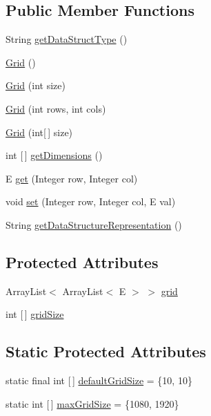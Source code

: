 \subsection*{Public Member Functions}
\begin{DoxyCompactItemize}
\item 
String \mbox{\hyperlink{classbridges_1_1base_1_1_grid_a81f268dd27c292ff2af9358039d4ebe6}{get\+Data\+Struct\+Type}} ()
\item 
\mbox{\hyperlink{classbridges_1_1base_1_1_grid_aa621ffc958db8341f7ce37ed78944d51}{Grid}} ()
\item 
\mbox{\hyperlink{classbridges_1_1base_1_1_grid_a9818d4959813f1292c6a234bc6f6aa9e}{Grid}} (int size)
\item 
\mbox{\hyperlink{classbridges_1_1base_1_1_grid_a43a699bd7ae2c6c986f978c515ff97d8}{Grid}} (int rows, int cols)
\item 
\mbox{\hyperlink{classbridges_1_1base_1_1_grid_ab9975b28d8dda7f3fbe0e35a7a026772}{Grid}} (int\mbox{[}$\,$\mbox{]} size)
\item 
int \mbox{[}$\,$\mbox{]} \mbox{\hyperlink{classbridges_1_1base_1_1_grid_aee8a5b66095d65ff067a4e76f2611b0e}{get\+Dimensions}} ()
\item 
E \mbox{\hyperlink{classbridges_1_1base_1_1_grid_a698579bb5b7166f76a18a1b04916e090}{get}} (Integer row, Integer col)
\item 
void \mbox{\hyperlink{classbridges_1_1base_1_1_grid_ab79ceb737423bb28ea2348e61a625a17}{set}} (Integer row, Integer col, E val)
\item 
String \mbox{\hyperlink{classbridges_1_1base_1_1_grid_a9a7faf2bbabae8d2f2babe9e29deb2c8}{get\+Data\+Structure\+Representation}} ()
\end{DoxyCompactItemize}
\subsection*{Protected Attributes}
\begin{DoxyCompactItemize}
\item 
Array\+List$<$ Array\+List$<$ E $>$ $>$ \mbox{\hyperlink{classbridges_1_1base_1_1_grid_ad1f3f6968d58188425bd992c05c655a6}{grid}}
\item 
int \mbox{[}$\,$\mbox{]} \mbox{\hyperlink{classbridges_1_1base_1_1_grid_a54a66479f78022570253d771206a0420}{grid\+Size}}
\end{DoxyCompactItemize}
\subsection*{Static Protected Attributes}
\begin{DoxyCompactItemize}
\item 
static final int \mbox{[}$\,$\mbox{]} \mbox{\hyperlink{classbridges_1_1base_1_1_grid_a45c2786d2af83624202192857a27724f}{default\+Grid\+Size}} = \{10, 10\}
\item 
static int \mbox{[}$\,$\mbox{]} \mbox{\hyperlink{classbridges_1_1base_1_1_grid_a803fd4c070a22863c82581f0bb258c1c}{max\+Grid\+Size}} = \{1080, 1920\}
\end{DoxyCompactItemize}


